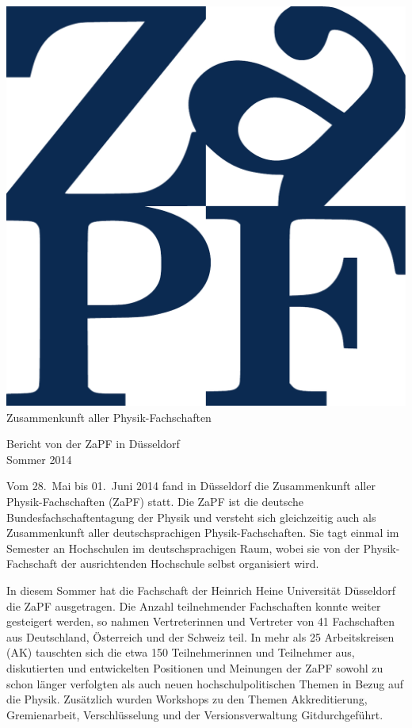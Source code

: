 \documentclass{scrartcl}
\begin{document}
\hspace{0.74\textwidth}
\begin{minipage}{0.25\textwidth}
\vspace{-1cm}
\centering
\includegraphics[width=.89\textwidth]{logo.pdf}
\small Zusammenkunft aller Physik-Fachschaften
\end{minipage}
 
\begin{center}
\vspace{1.5cm}
\huge{Bericht von der ZaPF in D\"usseldorf \\ Sommer 2014} 
\vspace{1cm}
\end{center}
Vom 28.\ Mai bis 01.\ Juni 2014 fand in D\"usseldorf die Zusammenkunft aller Physik-Fachschaften (ZaPF) statt. Die ZaPF ist die deutsche Bundesfachschaftentagung der Physik und versteht sich gleichzeitig auch als Zusammenkunft aller deutschsprachigen Physik-Fachschaften. Sie tagt einmal im Semester an Hochschulen im deutschsprachigen Raum, wobei sie von der  Physik-Fachschaft der ausrichtenden Hochschule selbst organisiert wird. 

In diesem Sommer hat die Fachschaft der Heinrich Heine Universität D\"usseldorf die ZaPF ausgetragen. Die Anzahl teilnehmender Fachschaften konnte weiter gesteigert werden, so nahmen Vertreterinnen und Vertreter von 41 Fachschaften aus Deutschland, \"Osterreich und der Schweiz teil. In mehr als 25 Arbeitskreisen (AK) tauschten sich die etwa 150 Teilnehmerinnen und Teilnehmer aus, diskutierten und entwickelten Positionen und Meinungen der ZaPF sowohl zu schon l\"anger verfolgten als auch neuen hochschulpolitischen Themen in Bezug auf die Physik. Zus\"atzlich wurden Workshops zu den Themen Akkreditierung, Gremienarbeit, Verschl\"usselung und der Versionsverwaltung \glqq Git\grqq durchgef\"uhrt.
\end{document}
